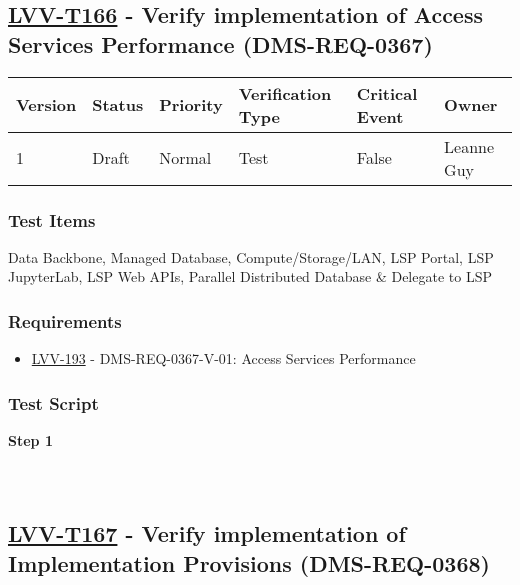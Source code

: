 \hypertarget{lvv-t166---verify-implementation-of-access-services-performance-dms-req-0367}{%
\subsection{\texorpdfstring{\href{https://jira.lsstcorp.org/secure/Tests.jspa\#/testCase/LVV-T166}{LVV-T166}
- Verify implementation of Access Services Performance
(DMS-REQ-0367)}{LVV-T166 - Verify implementation of Access Services Performance (DMS-REQ-0367)}}\label{lvv-t166---verify-implementation-of-access-services-performance-dms-req-0367}}

\begin{longtable}[]{@{}llllll@{}}
\toprule
Version & Status & Priority & Verification Type & Critical Event &
Owner\tabularnewline
\midrule
\endhead
1 & Draft & Normal & Test & False & Leanne Guy\tabularnewline
\bottomrule
\end{longtable}

\hypertarget{test-items-66}{%
\subsubsection{Test Items}\label{test-items-66}}

Data Backbone, Managed Database, Compute/Storage/LAN, LSP Portal, LSP
JupyterLab, LSP Web APIs, Parallel Distributed Database \& Delegate to
LSP

\hypertarget{requirements-66}{%
\subsubsection{Requirements}\label{requirements-66}}

\begin{itemize}
\tightlist
\item
  \href{https://jira.lsstcorp.org/browse/LVV-193}{LVV-193} -
  DMS-REQ-0367-V-01: Access Services Performance
\end{itemize}

\hypertarget{test-script-66}{%
\subsubsection{Test Script}\label{test-script-66}}

\textbf{Step 1}\\
~\\
~\\

\hypertarget{lvv-t167---verify-implementation-of-implementation-provisions-dms-req-0368}{%
\subsection{\texorpdfstring{\href{https://jira.lsstcorp.org/secure/Tests.jspa\#/testCase/LVV-T167}{LVV-T167}
- Verify implementation of Implementation Provisions
(DMS-REQ-0368)}{LVV-T167 - Verify implementation of Implementation Provisions (DMS-REQ-0368)}}\label{lvv-t167---verify-implementation-of-implementation-provisions-dms-req-0368}}

